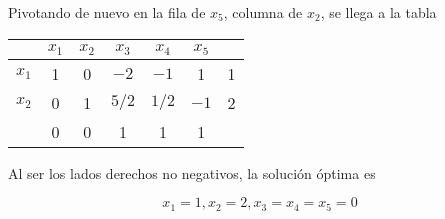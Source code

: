 \documentclass[openany]{book}
\begin{document}
\begin{example}
  Pivotando de nuevo en la fila de $x_{5}$, columna de $x_{2}$, se llega a la tabla

  \begin{tabular}{c|ccccc|c}
  \hline & $x_{1}$ & $x_{2}$ & $x_{3}$ & $x_{4}$ & $x_{5}$ & \\
  \hline$x_{1}$ & 1 & 0 & $-2$ & $-1$ & 1 & 1 \\
  $x_{2}$ & 0 & 1 & $5 / 2$ & $1 / 2$ & $-1$ & 2 \\
  \hline & 0 & 0 & 1 & 1 & 1 & \\
  \hline
  \end{tabular}

  Al ser los lados derechos no negativos, la solución óptima es

  $$
  x_{1}=1, x_{2}=2, x_{3}=x_{4}=x_{5}=0
  $$
\end{example}
\end{document}
